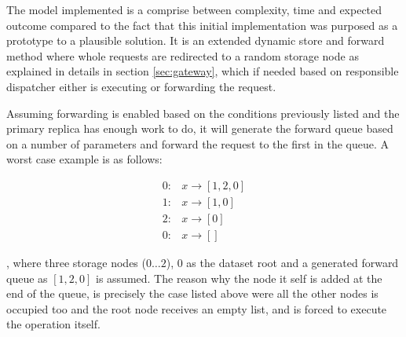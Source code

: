 The model implemented is a comprise between complexity, time and expected outcome compared to the fact that this initial \CodeName implementation was purposed as a prototype to a plausible solution. It is an extended dynamic store and forward method where whole requests are redirected to a random storage node as explained in details in section \ref{sec:gateway}, which if needed based on responsible dispatcher either is executing or forwarding the request. 
\newline

Assuming forwarding is enabled based on the conditions previously listed and the primary replica has enough work to do, it will generate the forward queue based on a number of parameters and forward the request to the first in the queue. A worst case example is as follows:
\vspace*{-5mm}
\begin{center}
\begin{align*}
	0: &x \rightarrow [1, 2, 0] \\
	1: &x \rightarrow [1, 0] \\
	2: &x \rightarrow [0] \\
	0: &x \rightarrow []
\end{align*}
\end{center}
, where three storage nodes ($0 \ldots 2$), $0$ as the dataset root and a generated forward queue as $[1, 2, 0]$ is assumed. The reason why the node it self is added at the end of the queue, is precisely the case listed above were all the other nodes is occupied too and the root node receives an empty list, and is forced to execute the operation itself.
